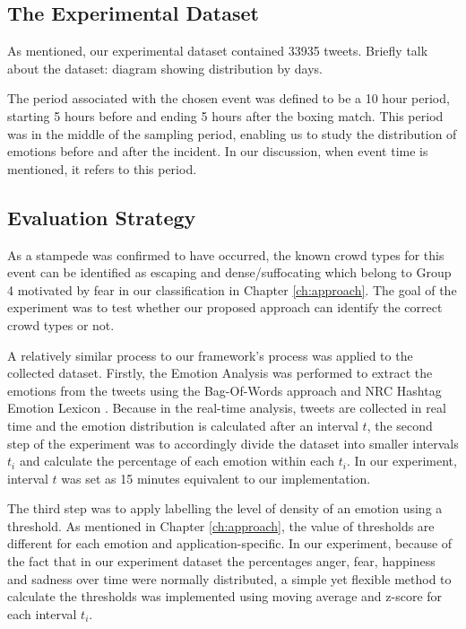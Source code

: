 \subsection{The Experimental Dataset}
As mentioned, our experimental dataset contained 33935 tweets. Briefly talk about the dataset: diagram showing distribution by days.

The period associated with the chosen event was defined to be a 10 hour period, starting 5 hours before and ending 5 hours after the boxing match. This period was in the middle of the sampling period, enabling us to study the distribution of emotions before and after the incident. In our discussion, when event time is mentioned, it refers to this period.

\subsection{Evaluation Strategy}
As a stampede was confirmed to have occurred, the known crowd types for this event can be identified as escaping and dense/suffocating which belong to Group 4 motivated by fear in our classification in Chapter \ref{ch:approach}. The goal of the experiment was to test whether our proposed approach can identify the correct crowd types or not.

A relatively similar process to our framework's process was applied to the collected dataset. Firstly, the Emotion Analysis was performed to extract the emotions from the tweets using the Bag-Of-Words approach and NRC Hashtag Emotion Lexicon \citep{mohammad2014using}. Because in the real-time analysis, tweets are collected in real time and the emotion distribution is calculated after an interval \(t\), the second step of the experiment was to accordingly divide the dataset into smaller intervals \(t_i\) and calculate the percentage of each emotion within each \(t_i\). In our experiment, interval \(t\) was set as 15 minutes equivalent to our implementation.

The third step was to apply labelling the level of density of an emotion using a threshold. As mentioned in Chapter \ref{ch:approach}, the value of thresholds are different for each emotion and application-specific. In our experiment, because of the fact that in our experiment dataset the percentages anger, fear, happiness and sadness over time were normally distributed, a simple yet flexible method to calculate the thresholds was implemented using moving average and z-score for each interval \(t_i\).

